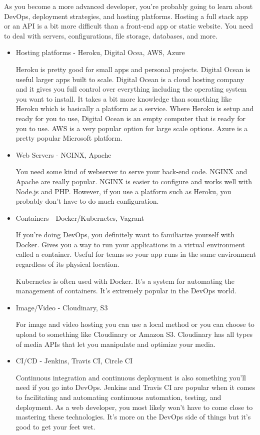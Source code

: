 As you become a more advanced developer, you're probably going to learn about DevOps, deployment strategies, and hosting platforms. Hosting a full stack app or an API is a bit more difficult than a front-end app or static website. You need to deal with servers, configurations, file storage, databases, and more. 
\begin{itemize}
    \item Hosting platforms - Heroku, Digital Ocea, AWS, Azure
    
    Heroku is pretty good for small apps and personal projects. Digital Ocean is useful larger apps built to scale. Digital Ocean is a cloud hosting company and it gives you full control over everything including the operating system you want to install. It takes a bit more knowledge than something like Heroku which is basically a platform as a service. Where Heroku is setup and ready for you to use, Digital Ocean is an empty computer that is ready for you to use. AWS is a very popular option for large scale options. Azure is a pretty popular Microsoft platform.
    \item Web Servers - NGINX, Apache
    
    You need some kind of webserver to serve your back-end code. NGINX and Apache are really popular. NGINX is easier to configure and works well with Node.js and PHP. However, if you use a platform such as Heroku, you probably don't have to do much configuration. 
    \item Containers - Docker/Kubernetes, Vagrant
    
    If you're doing DevOps, you definitely want to familiarize yourself with Docker. Gives you a way to run your applications in a virtual environment called a container. Useful for teams so your app runs in the same environment regardless of its physical location. 
    
    Kubernetes is often used with Docker. It's a system for automating the management of containers. It's extremely popular in the DevOps world. 
    \item Image/Video - Cloudinary, S3
    
    For image and video hosting you can use a local method or you can choose to upload to something like Cloudinary or Amazon S3. Cloudinary has all types of media APIs that let you manipulate and optimize your media. 
    \item CI/CD - Jenkins, Travis CI, Circle CI
    
    Continuous integration and continuous deployment is also something you'll need if you go into DevOps. Jenkins and Travis CI are popular when it comes to facilitating and automating continuous automation, testing, and deployment. As a web developer, you most likely won't have to come close to mastering these technologies. It's more on the DevOps side of things but it's good to get your feet wet.
\end{itemize}

